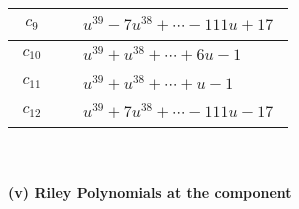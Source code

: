 \documentclass[1p]{elsarticle_modified}
\theoremstyle{definition}
\begin{document}
\begin{tabular}{m{50pt}|m{274pt}}
\hline $$\begin{aligned}c_{9}\end{aligned}$$&$\begin{aligned}
&u^{39}-7 u^{38}+\cdots-111 u+17
\end{aligned}$\\
\hline $$\begin{aligned}c_{10}\end{aligned}$$&$\begin{aligned}
&u^{39}+u^{38}+\cdots+6 u-1
\end{aligned}$\\
\hline $$\begin{aligned}c_{11}\end{aligned}$$&$\begin{aligned}
&u^{39}+u^{38}+\cdots+u-1
\end{aligned}$\\
\hline $$\begin{aligned}c_{12}\end{aligned}$$&$\begin{aligned}
&u^{39}+7 u^{38}+\cdots-111 u-17
\end{aligned}$\\
\hline
\end{tabular}\\~\\
\newpage\renewcommand{\arraystretch}{1}
\flushleft \textbf{(v) Riley Polynomials at the component}\newline \\
\end{document}
